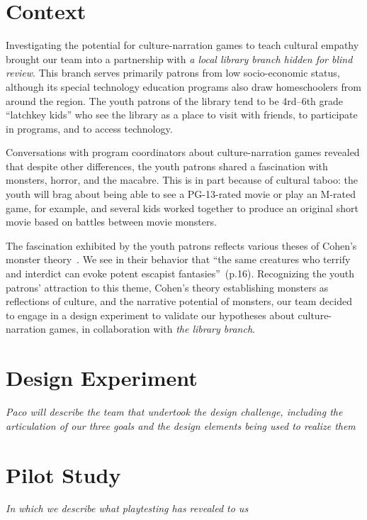 \documentclass[a4paper]{article}
\begin{document}
\section{Context}

Investigating the potential for culture-narration games to teach
cultural empathy brought our team into a partnership with
\textit{a local library branch hidden for blind review}. This branch
serves primarily patrons from low socio-economic status, although
its special technology education programs also draw homeschoolers from
around the region.
The youth patrons of the library tend to be 4rd--6th grade 
``latchkey kids'' who 
see the library as a place to visit with friends, to participate in programs,
and to access technology.

Conversations with program coordinators about culture-narration games
revealed that despite other differences, the youth patrons shared
a fascination with monsters, horror, and the macabre. 
This is in part because of cultural taboo: the youth will brag about
being able to see a PG-13-rated movie or play an M-rated game,
for example, and several kids worked together to produce an original
short movie based on battles between movie monsters.

The fascination exhibited by the youth patrons reflects various theses
of Cohen's monster theory~\citep{Cohen1996}. 
We see in their behavior that ``the same creatures who terrify and
interdict can evoke potent escapist fantasies''~(p.16).
Recognizing the youth patrons' attraction to this theme,
Cohen's theory establishing monsters as reflections of culture,
and the narrative potential of monsters,
our team decided to engage in a design experiment to validate our
hypotheses about culture-narration games,
in collaboration with \textit{the library branch}.


\section{Design Experiment}

\textit{Paco will describe the team that undertook the design challenge, including the articulation of our three goals and the design elements being used to realize them}

\section{Pilot Study}

\textit{In which we describe what playtesting has revealed to us}
\end{document}
